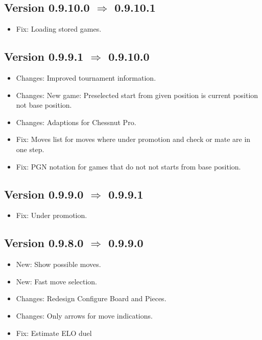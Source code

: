 \documentclass[11pt,a4paper]{article}
\begin{document}
\subsection*{Version 0.9.10.0 $\Rightarrow$  0.9.10.1}
\begin{itemize}
	\item {\color{red}Fix}: Loading stored games.
\end{itemize}



\subsection*{Version 0.9.9.1 $\Rightarrow$  0.9.10.0}
\begin{itemize}
	\item {\color{teal}Changes}: Improved tournament information.
	\item {\color{teal}Changes}: New game: Preselected start from given position is current position not base position.
	\item {\color{teal}Changes}: Adaptions for Chessnut Pro.
	\item {\color{red}Fix}: Moves list for moves where under promotion and check or mate are in one step.
	\item {\color{red}Fix}: PGN notation for games that do not not starts from base position.
\end{itemize}


\subsection*{Version 0.9.9.0 $\Rightarrow$  0.9.9.1}
\begin{itemize}
	\item {\color{red}Fix}: Under promotion.
\end{itemize}


\subsection*{Version 0.9.8.0 $\Rightarrow$  0.9.9.0}
\begin{itemize}
	\item {\color{blue}New}: Show possible moves.
	\item {\color{blue}New}: Fast move selection.
	\item {\color{teal}Changes}: Redesign Configure Board and Pieces.
	\item {\color{teal}Changes}: Only arrows for move indications.
	\item {\color{red}Fix}: Estimate ELO duel
\end{itemize}
\end{document}
